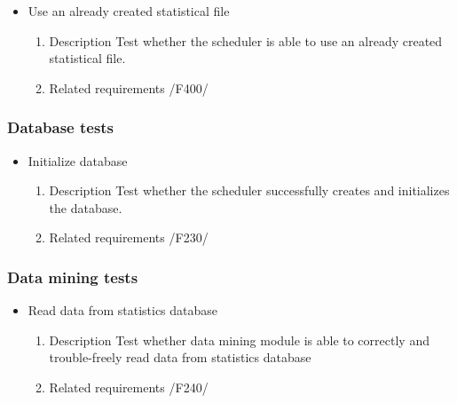 {\begin{itemize}
				\item Use an already created statistical file
				\begin{enumerate}
					\item Description\newline
Test whether the scheduler is able to use an already created statistical file.
					\item Related requirements\newline
						/F400/
				\end{enumerate}
								
			\end{itemize}
		
		\subsubsection{Database tests}
			\begin{itemize}
				
		
				\item Initialize database
				\begin{enumerate}
					\item Description\newline
Test whether the scheduler successfully creates and initializes the database.
					\item Related requirements\newline
					/F230/
				\end{enumerate}
			\end{itemize}
		
		\subsubsection{Data mining tests}
			\begin{itemize}
			
				\item Read data from statistics database
				\begin{enumerate}
					\item Description\newline
Test whether data mining module is able to correctly and trouble-freely read data from statistics database
					\item Related requirements\newline
					/F240/
				\end{enumerate}
				
				

\end{itemize}}
